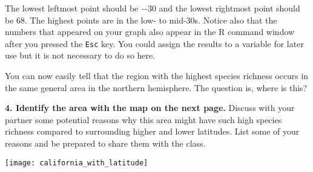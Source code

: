 \documentclass[11pt]{article}
\begin{document}
The lowest leftmost point should be $\minus$30 and the lowest rightmost point
should be 68. The highest points are in the low- to mid-30s. Notice also that
the numbers that appeared on your graph also appear in the R command
window after you pressed the \texttt{Esc} key. You could assign the
results to a variable for later use but it is not necessary to do so
here.

You can now easily tell that the region with the highest species
richness occurs in the same general area in the northern hemisphere. The
question is, where is this?

\textbf{4. Identify the area with the map on the next page.} Discuss with your
partner some potential reasons why this area might have such high
species richness compared to surrounding higher and lower latitudes.
List some of your reasons and be prepared to share them with the class.

\newpage

\begin{center}
	\texttt{[image: california\_with\_latitude]}
\end{center}
\end{document}
